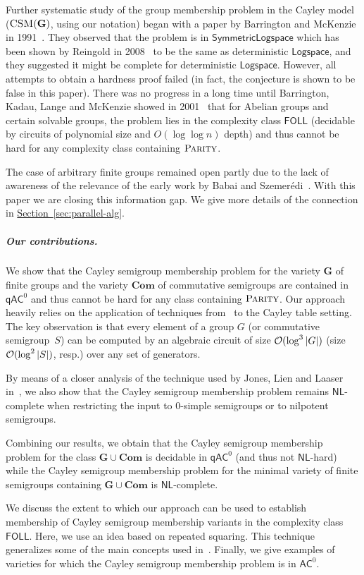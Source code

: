 \documentclass[11pt]{article}
\numberwithin{equation}{section}
\theoremstyle{definition}
\theoremstyle{plain}
\newcommand{\expref}[2]{\hyperref[#2]{#1~\ref{#2}}}
\newcommand{\union}{\mathbin{\cup}}
\newcommand{\abs}[1]{\ensuremath\left|#1\right|}
\newcommand{\FOLL}{\ensuremath{\mathsf{FOLL}}}
\newcommand{\AC}{\ensuremath{\mathsf{AC}}}
\newcommand{\qAC}{\ensuremath{\mathsf{qAC}}}
\newcommand{\LOGSPACE}{\ensuremath{\mathsf{Logspace}}}
\newcommand{\NL}{\ensuremath{\mathsf{NL}}}
\newcommand{\vCom}{\mathbf{Com}}
\newcommand{\vG}{\mathbf{G}}
\newcommand{\CSM}{\ensuremath{\textsc{CSM}}}
\newcommand{\Parity}{\ensuremath{\textsc{Parity}}}
\newcommand{\SCSM}{Cayley semigroup membership}
\newcommand{\SCSMP}{{\SCSM} problem}
\begin{document}
Further systematic study of the group membership problem in the Cayley model
($\CSM(\vG)$, using our notation) began with a paper by Barrington and McKenzie
in 1991~\cite{BarringtonM91}.
%
They observed that the problem is in %
$\mathsf{SymmetricLogspace}$  %
which has been shown 
by Reingold in 2008~\cite{Reingold08} %
to be the same as deterministic %
$\LOGSPACE$,
%
and
they  %
suggested it might be complete for deterministic %
$\LOGSPACE$.
However, all attempts to obtain a hardness proof failed (in fact,
the conjecture is shown to be false in this %
paper).  %
%
There was no progress in a long time until Barrington, Kadau, Lange and
McKenzie showed  %
in 2001~\cite{BarringtonKLM01}  %
that for Abelian groups and certain solvable groups, the
problem lies in the complexity class $\FOLL$ %
(decidable by circuits of polynomial size and $O(\log\log n)$ depth) %
and thus cannot be hard for any
complexity class containing $\Parity$. 
%

The case of arbitrary finite groups remained open partly due to the lack of
awareness of the relevance of the early work by Babai and
Szemer\'edi~\cite{BabaiS84}.  %
With this paper we are closing this information gap. We give more
details of the connection in \expref{Section}{sec:parallel-alg}.

\subparagraph{Our contributions.}  %
%

We show that the {\SCSMP} for the variety
%
$\vG$ of finite groups   %
and the variety 
%
$\vCom$ of commutative semigroups %
%
are   %
contained in $\qAC^0$ and thus
cannot be hard for any class containing $\Parity$.
%
Our approach heavily relies on the application of techniques
from~\cite{BabaiS84} to the Cayley table setting.
%
The key observation is that every element of a group $G$
%
(or commutative    %
semigroup~$S$) can be computed by an algebraic circuit of size
$\mathcal{O}(\log^3 \abs{G})$  
%
(size $\mathcal{O}(\log^2 \abs{S})$, resp.)  %
over any set of generators.

By means of a closer analysis of the technique used by Jones, Lien and Laaser
in~\cite{JonesLL76}, we also show that the {\SCSMP} remains $\NL$-complete when
restricting the input to $0$-simple semigroups or to nilpotent semigroups.

Combining our results, we obtain that the {\SCSMP} for the class
$\vG \union \vCom$ 
is decidable in $\qAC^0$ (and thus not $\NL$-hard) while the {\SCSMP}
for the minimal variety of finite semigroups containing $\vG \union \vCom$ is
$\NL$-complete.

We discuss the extent to which our approach can be used to establish
membership of {\SCSM} variants %
in  %
the complexity class $\FOLL$.
%
Here, we use an idea based on repeated squaring. This technique generalizes
some of the main concepts used in~\cite{BarringtonKLM01}.
%
Finally, we give examples of varieties for which the {\SCSMP} is in $\AC^0$.
\end{document}
